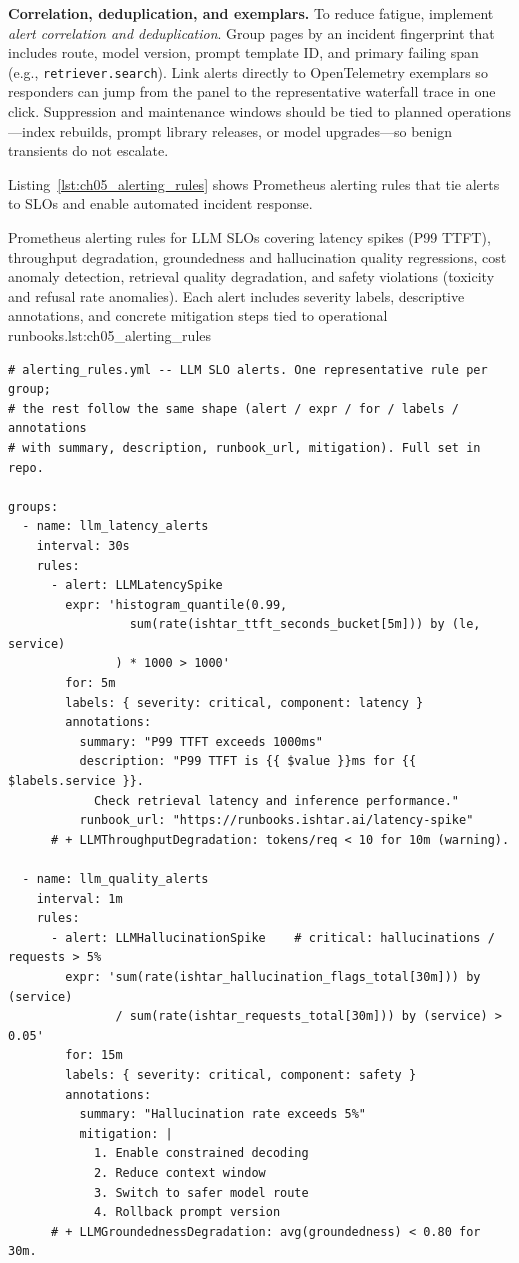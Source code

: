 \medskip
\noindent\textbf{Correlation, deduplication, and exemplars.}
To reduce fatigue, implement \emph{alert correlation and deduplication}. Group pages by an incident fingerprint that includes route, model version, prompt template ID, and primary failing span (e.g., \texttt{retriever.search}). Link alerts directly to OpenTelemetry exemplars so responders can jump from the panel to the representative waterfall trace in one click. Suppression and maintenance windows should be tied to planned operations—index rebuilds, prompt library releases, or model upgrades—so benign transients do not escalate.

Listing~\ref{lst:ch05_alerting_rules} shows Prometheus alerting rules that tie alerts to SLOs and enable automated incident response.

\begin{codebox}{Prometheus alerting rules for LLM SLOs covering latency spikes (P99 TTFT), throughput degradation, groundedness and hallucination quality regressions, cost anomaly detection, retrieval quality degradation, and safety violations (toxicity and refusal rate anomalies). Each alert includes severity labels, descriptive annotations, and concrete mitigation steps tied to operational runbooks.}{lst:ch05_alerting_rules}
\begin{verbatim}
# alerting_rules.yml -- LLM SLO alerts. One representative rule per group;
# the rest follow the same shape (alert / expr / for / labels / annotations
# with summary, description, runbook_url, mitigation). Full set in repo.

groups:
  - name: llm_latency_alerts
    interval: 30s
    rules:
      - alert: LLMLatencySpike
        expr: 'histogram_quantile(0.99,
                 sum(rate(ishtar_ttft_seconds_bucket[5m])) by (le, service)
               ) * 1000 > 1000'
        for: 5m
        labels: { severity: critical, component: latency }
        annotations:
          summary: "P99 TTFT exceeds 1000ms"
          description: "P99 TTFT is {{ $value }}ms for {{ $labels.service }}.
            Check retrieval latency and inference performance."
          runbook_url: "https://runbooks.ishtar.ai/latency-spike"
      # + LLMThroughputDegradation: tokens/req < 10 for 10m (warning).

  - name: llm_quality_alerts
    interval: 1m
    rules:
      - alert: LLMHallucinationSpike    # critical: hallucinations / requests > 5%
        expr: 'sum(rate(ishtar_hallucination_flags_total[30m])) by (service)
               / sum(rate(ishtar_requests_total[30m])) by (service) > 0.05'
        for: 15m
        labels: { severity: critical, component: safety }
        annotations:
          summary: "Hallucination rate exceeds 5%"
          mitigation: |
            1. Enable constrained decoding
            2. Reduce context window
            3. Switch to safer model route
            4. Rollback prompt version
      # + LLMGroundednessDegradation: avg(groundedness) < 0.80 for 30m.


\end{verbatim}
\end{codebox}
